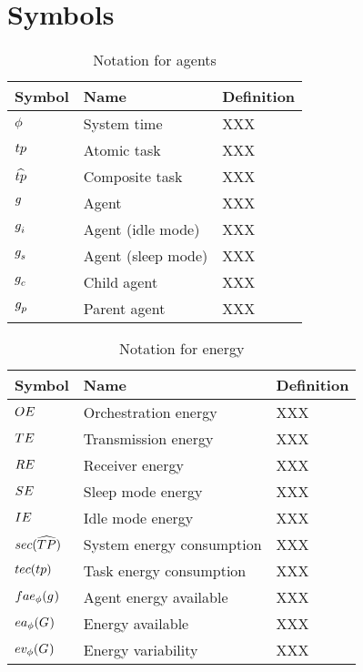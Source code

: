 \section{Symbols}

\begin{table}[pos=htp]
	\begin{tabular}{|p{}|p{}|p{}|}
		\hline
		Symbol & Name & Definition \\
		\hline
		$\phi$ & System time & XXX \\
		$\varAtomicTask{}{}$ & Atomic task & XXX \\
		$\varCompositeTask{}{}$ & Composite task & XXX \\
		$g_{}^{}$ & Agent & XXX \\
		$g_{i}^{}$ & Agent (idle mode) & XXX \\
		$g_{s}^{}$ & Agent (sleep mode) & XXX \\
		$g_{c}^{}$ & Child agent & XXX \\
		$g_{p}^{}$ & Parent agent & XXX \\
		\hline
	\end{tabular}
	\caption{Notation for agents}
\end{table}

\begin{table}[pos=htp]
	\begin{tabular}{|p{}|p{}|p{}|}
		\hline
		Symbol & Name & Definition \\
		\hline
		$OE$ & Orchestration energy & XXX \\
		$TE$ & Transmission energy & XXX \\
		$RE$ & Receiver energy & XXX \\
		$SE$ & Sleep mode energy & XXX \\
		$IE$ & Idle mode energy & XXX \\
		$\functionSystemEnergyConsumption{}{}$ & System energy consumption& XXX \\
		$\functionTaskEnergyConsumption{}{}$ & Task energy consumption & XXX \\

		$\functionAgentEnergyAvailable{}{}$ & Agent energy available & XXX \\
		$\functionEnergyAvailable{}{}$ & Energy available & XXX \\
		$\functionEnergyVariability{}{}$ & Energy variability& XXX \\
		\hline
	\end{tabular}
	\caption{Notation for energy}
\end{table}

